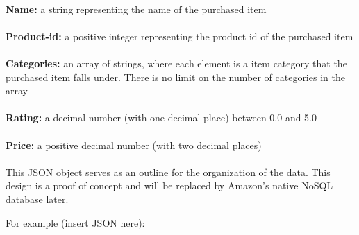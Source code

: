 \documentclass[12pt,a4paper]{article}
\begin{document}
		\\
		\textbf{Name:}  a string representing the name of the purchased item \\
		\\
		\textbf{Product-id:} a positive integer representing the product id of the 
		purchased item\\
		\\
		\textbf{Categories:} an array of strings, where each element is a item category that the purchased item falls under. There is no limit on the number of categories in the array\\
		\\
		\textbf{Rating:} a decimal number (with one decimal place) between 0.0 and 5.0\\
		\\
		\textbf{Price:} a positive decimal number (with two decimal places)\\
		\\
		This JSON object serves as an outline for the organization of the data. This design is a proof of concept and will be replaced by Amazon's native NoSQL database later.  
		
		For example (insert JSON here):
		
\end{document}
